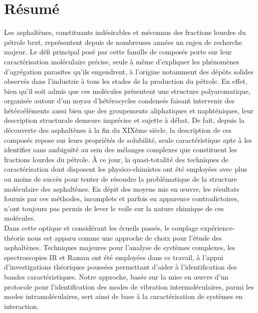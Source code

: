 	\chapter*{Résumé}
	\minitoc
	\restoregeometry
	
	
	Les asphaltènes, constituants indésirables et méconnus des fractions lourdes du pétrole brut, représentent depuis de nombreuses années un enjeu de recherche majeur. Le défi principal posé par cette famille de composés porte sur leur caractérisation moléculaire précise, seule à même d’expliquer les phénomènes d’agrégation parasites qu’ils engendrent, à l’origine notamment des dépôts solides observés dans l’industrie à tous les stades de la production du pétrole. En effet, bien qu’il soit admis que ces molécules présentent une structure polyaromatique, organisée autour d’un noyau d’hétérocycles condensés faisant intervenir des hétéroéléments aussi bien que des groupements aliphatiques et naphténiques, leur description structurale demeure imprécise et sujette à débat. De fait, depuis la découverte des asphaltènes à la fin du XIXème siècle, la description de ces composés repose sur leurs propriétés de solubilité, seule caractéristique apte à les identifier sans ambiguïté au sein des mélanges complexes que constituent les fractions lourdes du pétrole. 
	À ce jour, la quasi-totalité des techniques de caractérisation dont disposent les physico-chimistes ont été employées avec plus ou moins de succès pour tenter de résoudre la problématique de la structure moléculaire des asphaltènes. En dépit des moyens mis en œuvre, les résultats fournis par ces méthodes, incomplets et parfois en apparence contradictoires, n’ont toujours pas permis de lever le voile sur la nature chimique de ces molécules.\\
	 
	Dans cette optique et considérant les écueils passés, le couplage expérience-théorie nous est apparu comme une approche de choix pour l’étude des asphaltènes. Techniques majeures pour l’analyse de systèmes complexes, les spectroscopies IR et Raman ont été employées dans ce travail, à l’appui d’investigations théoriques poussées permettant d’aider à l’identification des bandes caractéristiques. Notre approche, basée sur la mise en œuvre d’un protocole pour l’identification des modes de vibration intermoléculaires, parmi les modes intramoléculaires, sert ainsi de base à la caractérisation de systèmes en interaction.\\
	 
